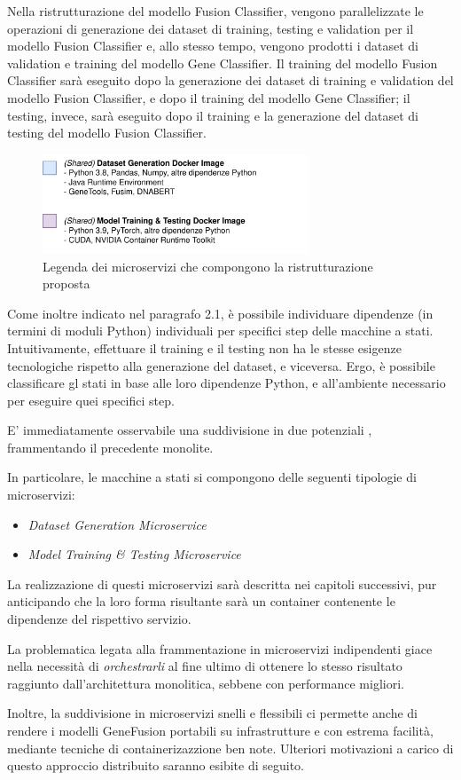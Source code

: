 Nella ristrutturazione del modello Fusion Classifier, vengono parallelizzate le operazioni di generazione dei dataset di training, testing e validation per il modello Fusion Classifier e, allo stesso tempo, vengono prodotti i dataset di validation e training del modello Gene Classifier. Il training del modello Fusion Classifier sarà eseguito dopo la generazione dei dataset di training e validation del modello Fusion Classifier, e dopo il training del modello Gene Classifier; il testing, invece, sarà eseguito dopo il training e la generazione del dataset di testing del modello Fusion Classifier.

\begin{figure}[h]
    \centering
    \includegraphics[width=300px]{figures/ch2/dependencies.png}
    \caption[Legenda dei microservizi che compongono la ristrutturazione proposta]{Legenda dei microservizi che compongono la ristrutturazione proposta}
    \label{fig:cha2:deps}
\end{figure}

Come inoltre indicato nel paragrafo 2.1, è possibile individuare dipendenze (in termini di moduli Python) individuali per specifici step delle macchine a stati. Intuitivamente, effettuare il training e il testing non ha le stesse esigenze tecnologiche rispetto alla generazione del dataset, e viceversa. Ergo, è possibile classificare gl stati in base alle loro dipendenze Python, e all'ambiente necessario per eseguire quei specifici step.

E' immediatamente osservabile una suddivisione in due potenziali , frammentando il precedente monolite.

In particolare, le macchine a stati si compongono delle seguenti tipologie di microservizi:

\begin{itemize}
    \item {\em Dataset Generation Microservice}
    \item {\em Model Training \& Testing Microservice}
\end{itemize}

La realizzazione di questi microservizi sarà descritta nei capitoli successivi, pur anticipando che la loro forma risultante sarà un container  contenente le dipendenze del rispettivo servizio.

La problematica legata alla frammentazione in microservizi indipendenti giace nella necessità di {\em orchestrarli} al fine ultimo di ottenere lo stesso risultato raggiunto dall'architettura monolitica, sebbene con performance migliori.

Inoltre, la suddivisione in microservizi snelli e flessibili ci permette anche di rendere i modelli GeneFusion portabili su infrastrutture  e  con estrema facilità, mediante tecniche di containerizazzione ben note. Ulteriori motivazioni a carico di questo approccio distribuito saranno esibite di seguito.